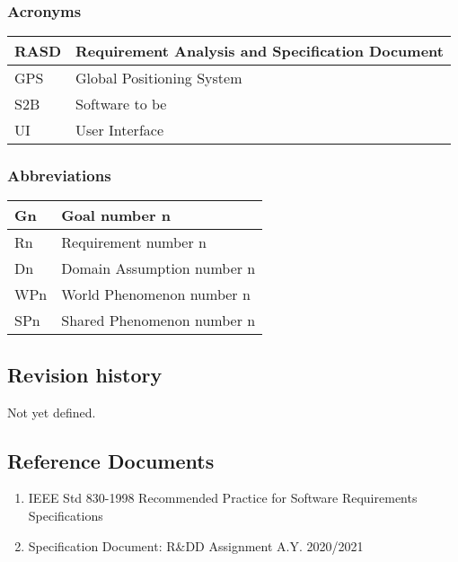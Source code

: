 \subsubsection{Acronyms}
\begin{tabular}{ | m{5cm} | m{10cm} | }
	\hline
	RASD & Requirement Analysis and Specification Document \\
	\hline
	GPS & Global Positioning System \\
	\hline
	S2B & Software to be \\
	\hline
	UI & User Interface\\
	\hline
\end{tabular}
\subsubsection{Abbreviations}
\begin{tabular}{ | m{5cm} | m{10cm} | }
	\hline
	Gn & Goal number n \\
	\hline
	Rn & Requirement number n \\
	\hline
	Dn & Domain Assumption number n \\
	\hline
	WPn & World Phenomenon number n \\
	\hline
	SPn & Shared Phenomenon number n \\
	\hline
\end{tabular}
\subsection{Revision history}
Not yet defined.
\subsection{Reference Documents}
\begin{enumerate}
	\item IEEE Std 830-1998 Recommended Practice for Software Requirements Specifications
	\item Specification Document: R\&DD Assignment A.Y. 2020/2021
\end{enumerate}
